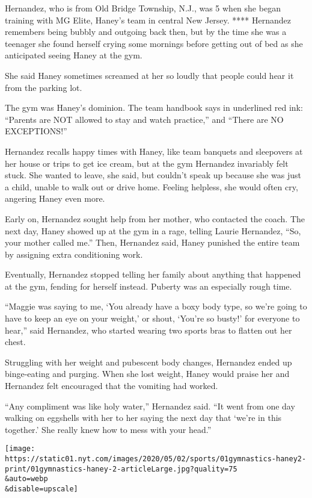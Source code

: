 Hernandez, who is from Old Bridge Township, N.J., was 5 when she began
training with MG Elite, Haney's team in central New Jersey. ****
Hernandez remembers being bubbly and outgoing back then, but by the time
she was a teenager she found herself crying some mornings before getting
out of bed as she anticipated seeing Haney at the gym.

She said Haney sometimes screamed at her so loudly that people could
hear it from the parking lot.

The gym was Haney's dominion. The team handbook says in underlined red
ink: ``Parents are NOT allowed to stay and watch practice,'' and ``There
are NO EXCEPTIONS!''

Hernandez recalls happy times with Haney, like team banquets and
sleepovers at her house or trips to get ice cream, but at the gym
Hernandez invariably felt stuck. She wanted to leave, she said, but
couldn't speak up because she was just a child, unable to walk out or
drive home. Feeling helpless, she would often cry, angering Haney even
more.

Early on, Hernandez sought help from her mother, who contacted the
coach. The next day, Haney showed up at the gym in a rage, telling
Laurie Hernandez, ``So, your mother called me.'' Then, Hernandez said,
Haney punished the entire team by assigning extra conditioning work.

Eventually, Hernandez stopped telling her family about anything that
happened at the gym, fending for herself instead. Puberty was an
especially rough time.

``Maggie was saying to me, `You already have a boxy body type, so we're
going to have to keep an eye on your weight,' or shout, `You're so
busty!' for everyone to hear,'' said Hernandez, who started wearing two
sports bras to flatten out her chest.

Struggling with her weight and pubescent body changes, Hernandez ended
up binge-eating and purging. When she lost weight, Haney would praise
her and Hernandez felt encouraged that the vomiting had worked.

``Any compliment was like holy water,'' Hernandez said. ``It went from
one day walking on eggshells with her to her saying the next day that
`we're in this together.' She really knew how to mess with your head.''

\texttt{[image: https://static01.nyt.com/images/2020/05/02/sports/01gymnastics-haney2-print/01gymnastics-haney-2-articleLarge.jpg?quality=75\\\&auto=webp\\\&disable=upscale]}

